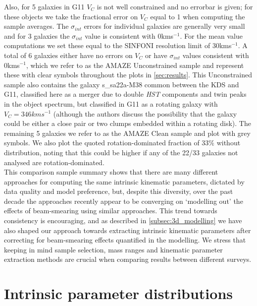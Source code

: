 \documentclass[fleqn,usenatbib]{mn2e}
\begin{document}
Also, for 5 galaxies in G11 $V_{C}$ is not well constrained and no errorbar is given; for these objects we take the fractional error on $V_{C}$ equal to 1 when computing the sample averages.
The $\sigma_{int}$ errors for individual galaxies are generally very small and for 3 galaxies the $\sigma_{int}$ value is consistent with 0kms$^{-1}$.
For the mean value computations we set these equal to the SINFONI resolution limit of 30kms$^{-1}$.
A total of 6 galaxies either have no errors on $V_{C}$ or have $\sigma_{int}$ values consistent with 0kms$^{-1}$, which we refer to as the AMAZE Unconstrained sample and represent these with clear symbols throughout the plots in \cref{sec:results}.
This Unconstrained sample also contains the galaxy s\_sa22a-M38 common between the KDS and G11, classified here as a merger due to double {\em HST} components and twin peaks in the object spectrum, but classified in G11 as a rotating galaxy with $V_{C} = 346kms^{-1}$ (although the authors discuss the possibility that the galaxy could be either a close pair or two clumps embedded within a rotating disk).
The remaining 5 galaxies we refer to as the AMAZE Clean sample and plot with grey symbols.
We also plot the quoted rotation-dominated fraction of 33$\%$ without distribution, noting that this could be higher if any of the 22/33 galaxies not analysed are rotation-dominated. \\
 
This comparison sample summary shows that there are many different approaches for computing the same intrinsic kinematic parameters, dictated by data quality and model preference, but, despite this diversity, over the past decade the approaches recently appear to be converging on `modelling out' the effects of beam-smearing using similar approaches.
This trend towards consistency is encouraging, and as described in \cref{subsec:3d_modelling} we have also shaped our approach towards extracting intrinsic kinematic parameters after correcting for beam-smearing effects quantified in the modelling.
We stress that keeping in mind sample selection, mass ranges and kinematic parameter extraction methods are crucial when comparing results between different surveys.

\section{Intrinsic parameter distributions}
\end{document}
